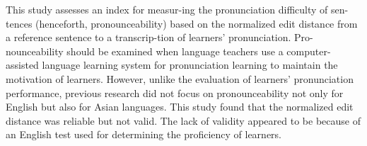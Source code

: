 This study assesses an index for measur-ing the pronunciation difficulty of sen-tences (henceforth, pronounceability) based on the normalized edit distance from a reference sentence to a transcrip-tion of learners' pronunciation. Pro-nounceability should be examined when language teachers use a computer-assisted language learning system for pronunciation learning to maintain the motivation of learners. However, unlike the evaluation of learners' pronunciation performance, previous research did not focus on pronounceability not only for English but also for Asian languages. This study found that the normalized edit distance was reliable but not valid. The lack of validity appeared to be because of an English test used for determining the proficiency of learners.
